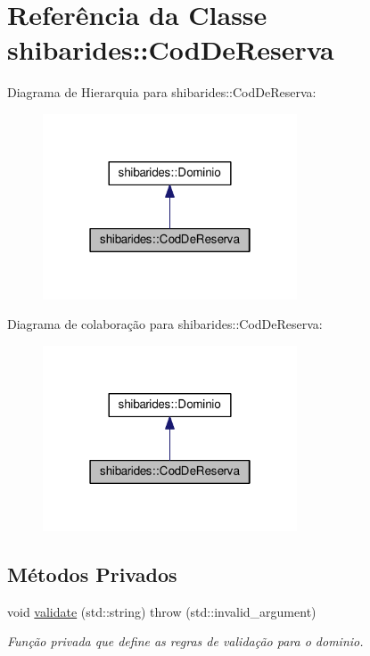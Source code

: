 \hypertarget{classshibarides_1_1CodDeReserva}{}\section{Referência da Classe shibarides\+:\+:Cod\+De\+Reserva}
\label{classshibarides_1_1CodDeReserva}


Diagrama de Hierarquia para shibarides\+:\+:Cod\+De\+Reserva\+:\nopagebreak
\begin{figure}[H]
\begin{center}
\leavevmode
\includegraphics[width=214pt]{classshibarides_1_1CodDeReserva__inherit__graph}
\end{center}
\end{figure}


Diagrama de colaboração para shibarides\+:\+:Cod\+De\+Reserva\+:\nopagebreak
\begin{figure}[H]
\begin{center}
\leavevmode
\includegraphics[width=214pt]{classshibarides_1_1CodDeReserva__coll__graph}
\end{center}
\end{figure}
\subsection*{Métodos Privados}
\begin{DoxyCompactItemize}
\item 
void \hyperlink{classshibarides_1_1CodDeReserva_a595a667ca295b1adc5eedefd773d8027}{validate} (std\+::string)  throw (std\+::invalid\+\_\+argument)
\begin{DoxyCompactList}\small\item\em Função privada que define as regras de validação para o dominio. \end{DoxyCompactList}\end{DoxyCompactItemize}
